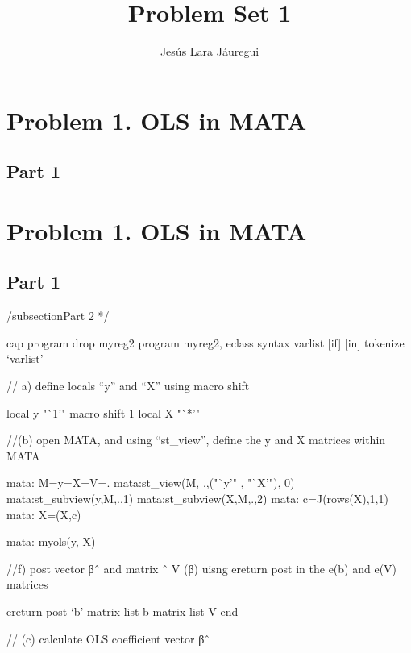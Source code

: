 \documentclass[12pt]{article}
\begin{document}
\author{Jesús Lara Jáuregui}
\title{Problem Set 1}
\maketitle



\section{Problem 1. OLS in MATA}
\subsection{Part 1}



\section{Problem 1. OLS in MATA}
\subsection{Part 1}



\begin{stlog}\end{stlog}
/subsection{Part 2}
*/

cap program drop myreg2
program myreg2, eclass
syntax varlist [if] [in]
tokenize `varlist'

// a) define locals “y” and “X” using macro shift

  local y "`1'"
  macro shift 1
  local X "`*'"
  
//(b) open MATA, and using “st_view”, define the y and X matrices within MATA
   
   mata: M=y=X=V=.
   mata:st_view(M, .,("`y'" , "`X'"), 0)
   mata:st_subview(y,M,.,1)
   mata:st_subview(X,M,.,2\.)
   mata: c=J(rows(X),1,1)
   mata: X=(X,c)

   mata: myols(y, X)

   //f) post vector βˆ and matrix ˆ V (β) uisng ereturn post in the e(b) and e(V) matrices
   
 ereturn post `b'
   matrix list b
   matrix list V
end

// (c) calculate OLS coefficient vector βˆ 
\end{document}
